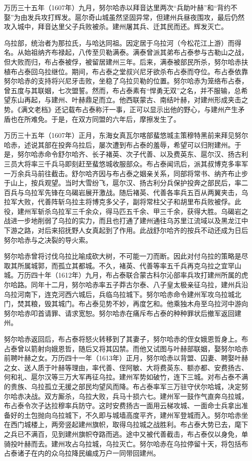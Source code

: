 万历三十五年（1607年）九月，努尔哈赤以拜音达里两次“兵助叶赫”和“背约不娶”为由发兵攻打辉发。扈尔奇山城虽然坚固异常，但建州兵昼夜围攻，最后仍然攻入城中，拜音达里父子兵败被杀。建州屠其兵、迁其民而还。辉发灭亡。

乌拉部，统治者为那拉氏，与哈达同祖。因定居于乌拉河（今松花江上游）而得名。从始祖纳齐布禄起，八传至贝勒满泰。满泰曾派其弟布占泰参与古勒山之战，但大败而归，布占泰被俘，被留居建州三年。后来，满泰被部民所杀，努尔哈赤扶植布占泰回乌拉继位。期间，布占泰之堂叔兴尼牙欲杀布占泰而夺位。布占泰依靠努尔哈赤的支持将兴尼牙击败，坐稳了乌拉贝勒的位置。努尔哈赤为笼络布占泰，曾五度与其联姻，七次盟誓。然而，布占泰素有“悍勇无双”之名，并不服输，总希望东山再起，与建州、叶赫鼎足而立。他西联蒙古、南结叶赫，对建州形成夹击之势。《满文老档》还记载布占泰称汗一事，正可以显示出他的野心，与建州产生矛盾也在所难免。于是，在双方同盟的六年后，摩擦发生了。

万历三十五年（1607年）正月，东海女真瓦尔喀部蜚悠城主策穆特黑前来拜见努尔哈赤，述说其部在投奔乌拉后，屡次遭到布占泰的羞辱，希望可以归附建州。于是，努尔哈赤命令舒尔哈齐、长子褚英、次子代善、以及费英东、扈尔汉、扬古利三员大将率三千兵马即刻赶至蜚悠城收服部众。布占泰闻讯后，派其叔博克多率军一万余兵马前往截击。舒尔哈齐因与布占泰之姻亲关系，同部将常书、纳齐布止步于山上，按兵观望。当时大雪纷飞，扈尔汉、扬古利分兵保护投奔之部民后，率二百兵与乌拉军先锋在乌碣岩展开激战。随后褚英、代善各率兵五百从两翼夹击，乌拉军大败，代善阵斩乌拉主将博克多父子，副将常柱父子和胡里布兵败被俘。此役，建州军斩杀乌拉军三千余众，得马匹五千余、甲三千余，获得大胜。乌碣岩之战进一步地削弱了乌拉的实力，而且也打通了建州通往乌苏里江流域以及黑龙江中下游之路，对后来招抚野人女真起到了作用。此战舒尔哈齐的按兵不动还成为日后努尔哈赤与之决裂的导火索。

努尔哈赤曾将讨伐乌拉比喻成砍大树，不可能一刀而断。因此对付乌拉的策略是尽取其所属城郭，而孤立其都城。不久，褚英、代善等率五千兵再克乌拉之宜罕山城。万历四十年（1612年）九月，布占泰联合蒙古科尔沁部率兵攻打建州所属的虎尔哈路。同年十二月，努尔哈赤率五子莽古尔泰、八子皇太极亲征乌拉，建州兵沿乌拉河南下，连克河西六城后，兵临乌拉城下。努尔哈赤命令建州军攻乌拉城北门，焚其粮，毁其城门。布占泰见势不妙，再度乞和。他乘独木舟至乌拉河中游向努尔哈赤叩首请罪、请求宽恕。努尔哈赤在痛斥布占泰的种种罪状后撤军返回建州。

努尔哈赤返回后，布占泰将怒火转移到了其妻子，努尔哈赤的侄女娥恩哲身上。布占泰曾以箭射向娥恩哲，随后又将其囚禁。而他又试图与叶赫部联姻，娶努尔哈赤前聘叶赫之女。万历四十一年（1613年）正月，努尔哈赤以背盟、囚妻、聘娶叶赫之女、送人质于叶赫等理由，率代善、侄阿敏、大将费英东、额亦都、安费扬古、何和礼、扈尔汉等三万大军再征乌拉。建州军势如破竹，连下三城。对布占泰不满的贵族、乌拉孤立无援之部民均望风而降。布占泰率军三万驻守伏尔哈城，决定努尔哈赤决战。双方厮杀，乌拉大败，兵马十损六七。建州军一鼓作气直奔乌拉城，布占泰令次子达拉穆率兵防守。这时安费扬古一面用云梯攻城、一面命士兵拿出准备好的土包抛向乌拉城下，不久即与城墙高度平齐，建州军登城而入。努尔哈赤坐在西门城楼上，两旁竖起建州旗帜，取得乌拉城之战胜利。布占泰大势已去，麾下之兵已不满百，见到建州旗帜夺路而逃。途中又被代善截击，布占泰仅以身免，单骑投叶赫而去。建州攻占乌拉城，乌拉灭亡。努尔哈赤在乌拉停留十天，将包括布占泰诸子在内的众乌拉降民编成万户一同带回建州。

